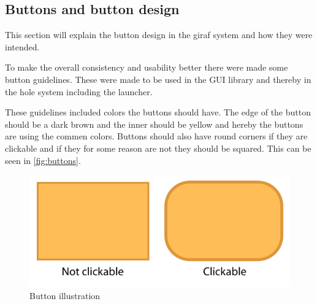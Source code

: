 \subsection{Buttons and button design}
This section will explain the button design in the giraf system and how they were intended.

To make the overall consistency and usability better there were made some button guidelines. These were made to be used in the \giraf[] GUI library and thereby in the hole \giraf[] system including the launcher.

These guidelines included colors the buttons should have. The edge of the button should be a dark brown and the inner should be yellow and hereby the buttons are using the commen \giraf[] colors. Buttons should also have round corners if they are clickable and if they for some reason are not they should be squared. This can be seen in \autoref{fig:buttons}.

\begin{figure}[h!]
	\centering
	\includegraphics[scale=0.6]{gfx/buttons.pdf}
	\caption{Button illustration}
	\label{fig:buttons}
\end{figure}


